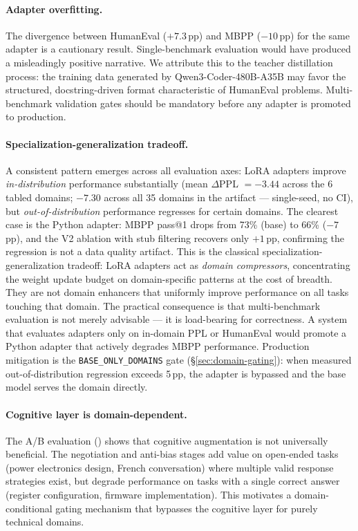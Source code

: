 \documentclass[11pt,a4paper]{article}
\begin{document}
\paragraph{Adapter overfitting.}
The divergence between HumanEval ($+7.3$\,pp) and MBPP ($-10$\,pp) for the same adapter is a cautionary result. Single-benchmark evaluation would have produced a misleadingly positive narrative. We attribute this to the teacher distillation process: the training data generated by Qwen3-Coder-480B-A35B may favor the structured, docstring-driven format characteristic of HumanEval problems. Multi-benchmark validation gates should be mandatory before any adapter is promoted to production.

\paragraph{Specialization-generalization tradeoff.}
A consistent pattern emerges across all evaluation axes: LoRA adapters improve \emph{in-distribution} performance substantially (mean $\Delta$PPL $= -3.44$ across the 6 tabled domains; $-7.30$ across all 35 domains in the artifact --- single-seed, no CI), but \emph{out-of-distribution} performance regresses for certain domains. The clearest case is the Python adapter: MBPP pass@1 drops from 73\% (base) to 66\% ($-7$\,pp), and the V2 ablation with stub filtering recovers only $+1$\,pp, confirming the regression is not a data quality artifact. This is the classical specialization-generalization tradeoff: LoRA adapters act as \emph{domain compressors}, concentrating the weight update budget on domain-specific patterns at the cost of breadth. They are not domain enhancers that uniformly improve performance on all tasks touching that domain. The practical consequence is that multi-benchmark evaluation is not merely advisable --- it is load-bearing for correctness. A system that evaluates adapters only on in-domain PPL or HumanEval would promote a Python adapter that actively degrades MBPP performance. Production mitigation is the \texttt{BASE\_ONLY\_DOMAINS} gate (\S\ref{sec:domain-gating}): when measured out-of-distribution regression exceeds 5\,pp, the adapter is bypassed and the base model serves the domain directly.

\paragraph{Cognitive layer is domain-dependent.}
The A/B evaluation () shows that cognitive augmentation is not universally beneficial. The negotiation and anti-bias stages add value on open-ended tasks (power electronics design, French conversation) where multiple valid response strategies exist, but degrade performance on tasks with a single correct answer (register configuration, firmware implementation). This motivates a domain-conditional gating mechanism that bypasses the cognitive layer for purely technical domains.
\end{document}
